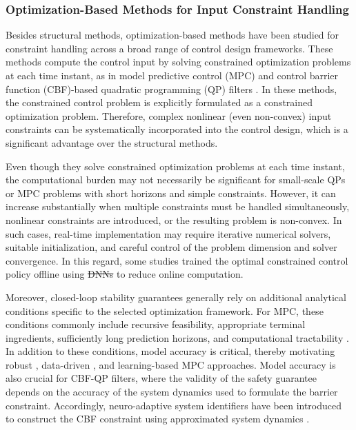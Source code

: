 \documentclass[letterpaper, journal, twoside]{IEEEtran}
\providecommand{\DIFadd}[1]{{\protect\color{blue}\uwave{#1}}} %
\providecommand{\DIFdel}[1]{{\protect\color{red}\sout{#1}}} %
\providecommand{\DIFaddbegin}{} %
\providecommand{\DIFaddend}{} %
\providecommand{\DIFdelbegin}{} %
\providecommand{\DIFdelend}{} %
\begin{document}


\subsubsection{Optimization-Based Methods for Input Constraint Handling}

Besides structural methods, optimization-based methods have been studied for constraint handling across a broad range of control design frameworks.
These methods compute the control input by solving constrained optimization problems at each time instant, as in model predictive control (MPC) \cite{Vahidi-Moghaddam:2025aa,Mallick:2025aa,Khodaverdian:2025aa,Greune:2011aa,Bemporad:1999aa,Berberich:2025aa,Draeger:1995aa} and control barrier function (CBF)-based quadratic programming (QP) filters \cite{Ames:2019aa,Ko:2025aa,Sweatland:2025aa}. 
In these methods, the constrained control problem is explicitly formulated as a constrained optimization problem.
Therefore, complex nonlinear (even non-convex) input constraints can be systematically incorporated into the control design, which is a significant advantage over the structural methods.

Even though they solve constrained optimization problems at each time instant, the computational burden may not necessarily be significant for small-scale QPs or MPC problems with short horizons and simple constraints.
However, it can increase substantially when multiple constraints must be handled simultaneously, nonlinear constraints are introduced, or the resulting problem is non-convex.
In such cases, real-time implementation may require iterative numerical solvers, suitable initialization, and careful control of the problem dimension and solver convergence.
In this regard, some studies \cite{Vahidi-Moghaddam:2025aa,Mallick:2025aa,Khodaverdian:2025aa} trained the optimal constrained control policy offline using \DIFdelbegin \DIFdel{DNNs }\DIFdelend \DIFaddbegin \DIFadd{deep NNs (DNNs) }\DIFaddend to reduce online computation.

Moreover, closed-loop stability guarantees generally rely on additional analytical conditions specific to the selected optimization framework.
For MPC, these conditions commonly include recursive feasibility, appropriate terminal ingredients, sufficiently long prediction horizons, and computational tractability \cite{Greune:2011aa}.
In addition to these conditions, model accuracy is critical, thereby motivating robust \cite{Bemporad:1999aa}, data-driven \cite{Berberich:2025aa}, and learning-based MPC \cite{Draeger:1995aa,Vahidi-Moghaddam:2025aa} approaches.
Model accuracy is also crucial for CBF-QP filters, where the validity of the safety guarantee depends on the accuracy of the system dynamics used to formulate the barrier constraint.
Accordingly, neuro-adaptive system identifiers have been introduced to construct the CBF constraint using approximated system dynamics \cite{Sweatland:2025aa}.
\end{document}
